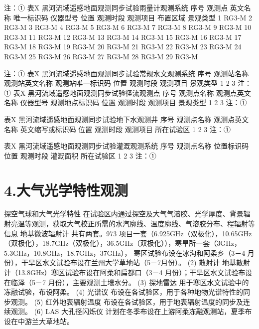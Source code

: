 \documentclass[letterpaper,10pt,english]{sphinxmanual}
\begin{document}
注：①
表X 黑河流域遥感地面观测同步试验雨量计观测系统
序号      观测点     英文名称    唯一标识码   仪器型号    位置      观测时段    观测项目    布置区域    景观类型
1                               RG3-M
2                               RG3-M
3                               RG3-M
4                               RG3-M
5                               RG3-M
6                               RG3-M
7                               RG3-M
8                               RG3-M
9                               RG3-M
10                              RG3-M
11                              RG3-M
12                              RG3-M
13                              RG3-M
14                              RG3-M
15                              RG3-M
16                              RG3-M
17                              RG3-M
18                              RG3-M
19                              RG3-M
20                              RG3-M
21                              RG3-M
22                              RG3-M
23                              RG3-M
24                              RG3-M
25                              RG3-M
26                              RG3-M
27                              RG3-M
28                              RG3-M
29                              RG3-M

注：①
表X 黑河流域遥感地面观测同步试验常规水文观测系统
序号      观测站名称   观测站英文名称 观测站唯一标识码        位置      观测时段    观测项目    景观类型
1
2
3
注：①
表X 黑河流域遥感地面观测同步试验径流观测点
序号      观测点名称   观测点英文名称 仪器型号    观测地点标识码 位置      观测时段    观测项目    景观类型
1
2
3
注：①

表X 黑河流域遥感地面观测同步试验地下水观测井
序号      观测点名称   观测点英文名称 英文缩写或标识码        位置      观测时段    观测项目    所在试验区
1
2
3
注：①

表X 黑河流域遥感地面观测同步试验灌溉观测系统
序号      观测点名称   位置标识码   位置      观测时段    灌溉面积    所在试验区
1
2
3
注：①


\section{4.大气光学特性观测}
\label{water_observe_system:id5}
探空气球和大气光学特性
在试验区内通过探空及大气气溶胶、光学厚度、背景辐射亮温等观测，获取大气校正所需的水汽廓线、温度廓线、气溶胶分布、程辐射等信息
地基微波辐射计
共有两套。973 项目一套（6.925GHz（双极化），10.65GHz（双极化），18.7GHz（双极化），36.5GHz（双极化）），寒旱所一套（3GHz，5.3GHz，10.8GHz，18.7GHz，37GHz），
寒区试验布设在冰沟和阿柔乡（3－4 月份），干旱区水文试验布设在兰州大学草地站（5－7月份）。
(2) 散射计
地基散射计（13.8GHz）寒区试验布设在阿柔和扁都口（3－4 月份）；干旱区水文试验布设在临泽（5－7 月份），主要观测土壤水分。
(3) 探地雷达
用于寒区水文试验中的冻融试验，布设阿柔。
(4) 光谱议
布设在各试验区，用于各种地物光谱特性的同步观测。
(5) 红外地表辐射温度
布设在各试验区，用于地表辐射温度的同步及连续观测。
(6) LAS 大孔径闪烁仪
计划在冬季布设在上游阿柔冻融观测站，夏季布设在中游兰大草地站。
\end{document}
